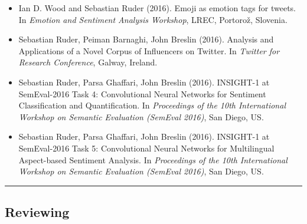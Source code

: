 \documentclass[10pt,letterpaper]{article}
\makeatletter
\newcommand{\headerrow}[2]
{\begin{tabular*}{\linewidth}{l@{\extracolsep{\fill}}r}
	#1 &
	#2 \\
\end{tabular*}}
\makeatother
\begin{document}
\begin{itemize}
	\parskip=0.1em
	
	\item Ian D. Wood and Sebastian Ruder (2016). Emoji as emotion tags for tweets. In \textit{Emotion and Sentiment Analysis Workshop}, LREC, Portorož, Slovenia.
	
	\item Sebastian Ruder, Peiman Barnaghi, John Breslin (2016). Analysis and Applications of a Novel Corpus of Influencers on Twitter. In \textit{Twitter for Research Conference}, Galway, Ireland.
	
	\item Sebastian Ruder, Parsa Ghaffari, John Breslin (2016). INSIGHT-1 at SemEval-2016 Task 4: Convolutional Neural Networks for Sentiment Classification and Quantification. In \textit{Proceedings of the 10th International Workshop on Semantic Evaluation (SemEval 2016)}, San Diego, US.
	
	\item Sebastian Ruder, Parsa Ghaffari, John Breslin (2016). INSIGHT-1 at SemEval-2016 Task 5: Convolutional Neural Networks for Multilingual Aspect-based Sentiment Analysis. In \textit{Proceedings of the 10th International Workshop on Semantic Evaluation (SemEval 2016)}, San Diego, US.

\end{itemize}

\hrule
\vspace{-0.4em}
\subsection*{Reviewing}

\end{document}
